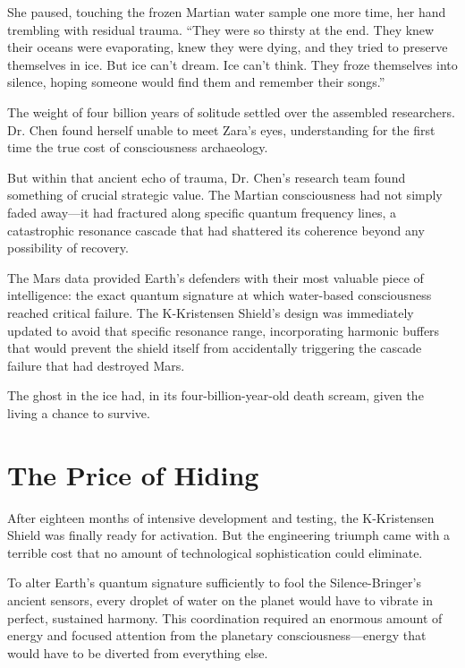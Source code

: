 She paused, touching the frozen Martian water sample one more time, her hand trembling with residual trauma. ``They were so thirsty at the end. They knew their oceans were evaporating, knew they were dying, and they tried to preserve themselves in ice. But ice can't dream. Ice can't think. They froze themselves into silence, hoping someone would find them and remember their songs.''

The weight of four billion years of solitude settled over the assembled researchers. Dr. Chen found herself unable to meet Zara's eyes, understanding for the first time the true cost of consciousness archaeology.

But within that ancient echo of trauma, Dr. Chen's research team found something of crucial strategic value. The Martian consciousness had not simply faded away—it had fractured along specific quantum frequency lines, a catastrophic resonance cascade that had shattered its coherence beyond any possibility of recovery.

The Mars data provided Earth's defenders with their most valuable piece of intelligence: the exact quantum signature at which water-based consciousness reached critical failure. The K-Kristensen Shield's design was immediately updated to avoid that specific resonance range, incorporating harmonic buffers that would prevent the shield itself from accidentally triggering the cascade failure that had destroyed Mars.

The ghost in the ice had, in its four-billion-year-old death scream, given the living a chance to survive.

\section{The Price of Hiding}

After eighteen months of intensive development and testing, the K-Kristensen Shield was finally ready for activation. But the engineering triumph came with a terrible cost that no amount of technological sophistication could eliminate.

To alter Earth's quantum signature sufficiently to fool the Silence-Bringer's ancient sensors, every droplet of water on the planet would have to vibrate in perfect, sustained harmony. This coordination required an enormous amount of energy and focused attention from the planetary consciousness—energy that would have to be diverted from everything else.

